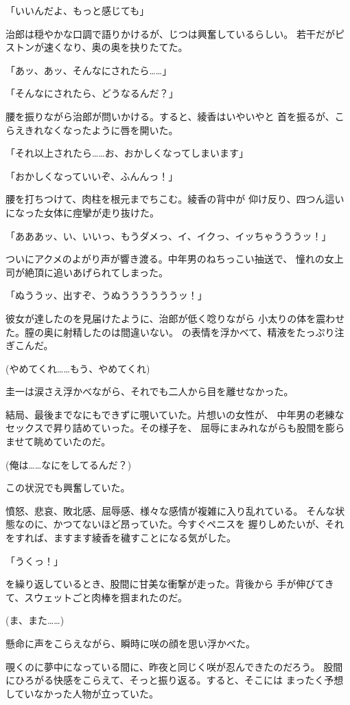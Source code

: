 ﻿\documentclass[
    book,tate,
    line_length=30zw,
    jafontsize=12pt,
    paper=b5j,
    landscape,
    ]{jlreq}
\begin{document}
「いいんだよ、もっと感じても」

治郎は穏やかな口調で語りかけるが、じつは興奮しているらしい。
若干だがピストンが速くなり、奥の奥を抉りたてた。

「あッ、あッ、そんなにされたら……」

「そんなにされたら、どうなるんだ？」

腰を振りながら治郎が問いかける。すると、綾香はいやいやと
首を振るが、こらえきれなくなったように唇を開いた。

「それ以上されたら……お、おかしくなってしまいます」

「おかしくなっていいぞ、ふんんっ！」

腰を打ちつけて、肉柱を根元までちこむ。綾香の背中が
仰け反り、四つん這いになった女体に痙攣が走り抜けた。

「あああッ、い、いいっ、もうダメっ、イ、イクっ、イッちゃうううッ！」

ついにアクメのよがり声が響き渡る。中年男のねちっこい抽送で、
憧れの女上司が絶頂に追いあげられてしまった。

「ぬううッ、出すぞ、うぬううううううッ！」

彼女が達したのを見届けたように、治郎が低く唸りながら
小太りの体を震わせた。膣の奥に射精したのは間違いない。
の表情を浮かべて、精液をたっぷり注ぎこんだ。

(やめてくれ……もう、やめてくれ)

圭一は涙さえ浮かべながら、それでも二人から目を離せなかった。

結局、最後までなにもできずに覗いていた。片想いの女性が、
中年男の老練なセックスで昇り詰めていった。その様子を、
屈辱にまみれながらも股間を膨らませて眺めていたのだ。

(俺は……なにをしてるんだ？)

この状況でも興奮していた。

憤怒、悲哀、敗北感、屈辱感、様々な感情が複雑に入り乱れている。
そんな状態なのに、かつてないほど昂っていた。今すぐペニスを
握りしめたいが、それをすれば、ますます綾香を穢すことになる気がした。

「うくっ！」

を繰り返しているとき、股間に甘美な衝撃が走った。背後から
手が伸びてきて、スウェットごと肉棒を掴まれたのだ。

(ま、また……)

懸命に声をこらえながら、瞬時に咲の顔を思い浮かべた。

覗くのに夢中になっている間に、昨夜と同じく咲が忍んできたのだろう。
股間にひろがる快感をこらえて、そっと振り返る。すると、そこには
まったく予想していなかった人物が立っていた。
\end{document}
